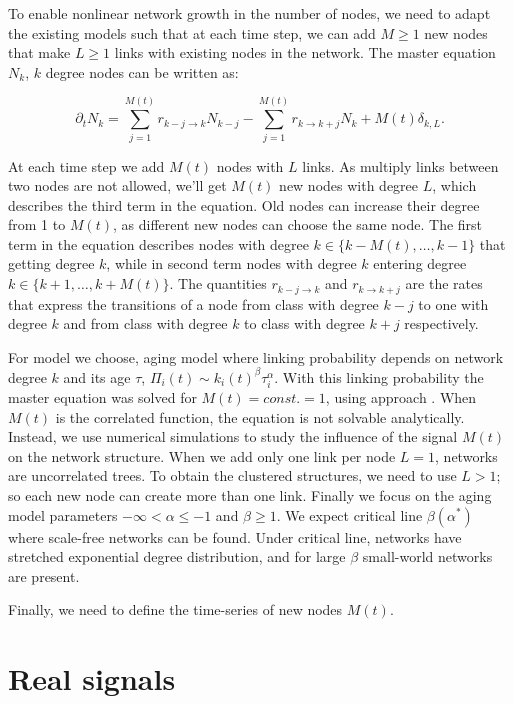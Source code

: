 To enable nonlinear network growth in the number of nodes, we need to adapt the existing models such that at each time step, we can add $M\geq1$ new nodes that make $L\geq1$ links with existing nodes in the network. The master equation $N_k$, $k$ degree nodes can be written as: 

\begin{equation}
\partial_{t}N_{k}=\sum^{M(t)}_{j=1}r_{k-j\longrightarrow k}N_{k-j}-\sum^{M(t)}_{j=1}r_{k\longrightarrow k+j}N_{k}+M(t)\delta_{k,L} . \label{eq:aging_master}  
\end{equation}

At each time step we add $M(t)$ nodes with $L$ links. As multiply links between two nodes are not allowed, we'll get $M(t)$ new nodes with degree $L$, which describes the third term in the equation. Old nodes can increase their degree from 1 to $M(t)$, as different new nodes can choose the same node. The first term in the equation describes nodes with degree $k\in\{k-M(t),\ldots, k-1\}$ that getting degree $k$, while in second term nodes with degree $k$ entering degree  $k\in\{k+1,\ldots, k+M(t)\}$. The quantities $r_{k-j\longrightarrow k}$ and $r_{k\longrightarrow k+j}$ are the rates that express the transitions of a node from class with degree $k-j$ to one with degree $k$ and from class with degree $k$ to class with degree $k+j$ respectively.  

For model we choose, aging model where linking probability depends on network degree $k$ and its age $\tau$, $\Pi_{i}(t)\sim k_{i}(t)^{\beta}\tau_{i}^{\alpha}$. With this linking probability the master equation was solved for $M(t)=const.=1$, using  approach \cite{dorogovtsev2001b}. When $M(t)$ is the correlated function, the equation is not solvable analytically. Instead, we use numerical simulations to study the influence of the signal $M(t)$ on the network structure. When we add only one link per node $L=1$, networks are uncorrelated trees. To obtain the clustered structures, we need to use $L>1$; so each new node can create more than one link. Finally we focus on the aging model parameters $-\infty<\alpha\leq-1$ and $\beta\geq1$. We expect critical line $\beta(\alpha^{*})$ where scale-free networks can be found. Under critical line, networks have stretched exponential degree distribution, and for large $\beta$ small-world networks are present. 

Finally, we need to define the time-series of new nodes $M(t)$. 




\section{Real signals}

